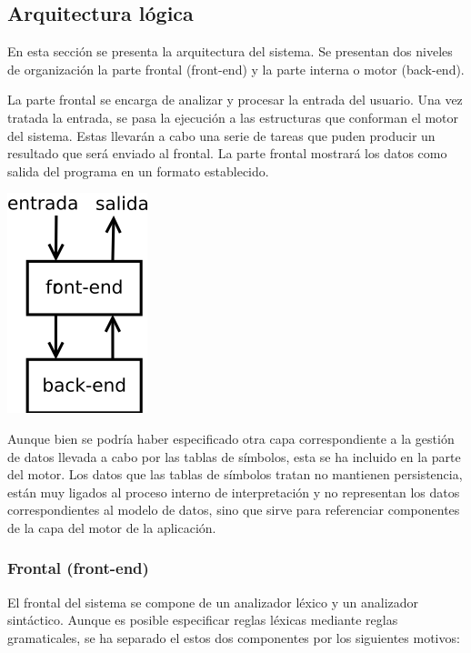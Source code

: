 \subsection {Arquitectura lógica}
En esta sección se presenta la arquitectura del sistema. Se presentan 
dos niveles de organización la parte frontal (front-end) y la parte 
interna o motor (back-end). 

La parte frontal se encarga de analizar y procesar la entrada del usuario.
Una vez tratada la entrada, se pasa la ejecución a las estructuras que conforman 
el motor del sistema. Estas llevarán a cabo una serie de tareas que puden producir
un resultado que será enviado al frontal. La parte frontal mostrará 
los datos como salida del programa en un formato establecido.

\begin{center}
\includegraphics[scale=0.7]{dia/generic.png} \\
\end{center}

Aunque bien se podría haber especificado otra capa correspondiente a la gestión de datos
llevada a cabo por las tablas de símbolos, esta se ha incluido en la parte del motor. Los datos que 
las tablas de símbolos tratan no mantienen persistencia, están muy ligados al proceso interno de 
interpretación y no representan los datos correspondientes al modelo de datos, sino que sirve para
referenciar componentes de la capa del motor de la aplicación.

\subsubsection{Frontal (front-end)}
El frontal del sistema se compone de un analizador léxico y un analizador sintáctico. 
Aunque es posible especificar reglas léxicas mediante reglas gramaticales, se ha separado el 
estos dos componentes por los siguientes motivos:

